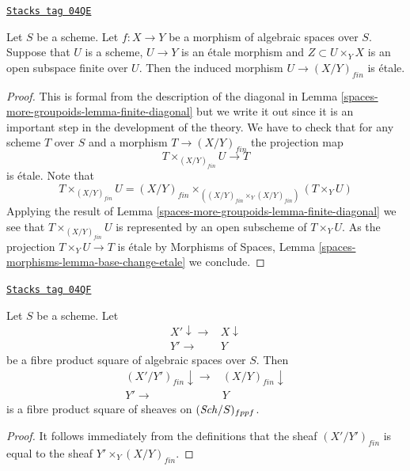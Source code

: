 \begin{lemma}
\label{spaces-more-groupoids-lemma-finite-criterion-etale}
\href{https://stacks.math.columbia.edu/tag/04QE}{\texttt{Stacks tag 04QE}}

Let $S$ be a scheme.
Let $f : X \to Y$ be a morphism of algebraic spaces over $S$.
Suppose that $U$ is a scheme, $U \to Y$ is an \'etale morphism and
$Z \subset U \times_Y X$ is an open subspace finite over $U$.
Then the induced morphism $U \to (X/Y)_{fin}$ is \'etale.
\end{lemma}

\begin{proof}
This is formal from the description of the diagonal in
Lemma \ref{spaces-more-groupoids-lemma-finite-diagonal}
but we write it out since it is an important step in the development
of the theory. We have to check that for any scheme $T$ over $S$ and a morphism
$T \to (X/Y)_{fin}$ the projection map
$$
T \times_{(X/Y)_{fin}} U \longrightarrow T
$$
is \'etale. Note that
$$
T \times_{(X/Y)_{fin}} U
=
(X/Y)_{fin} \times_{((X/Y)_{fin} \times_Y (X/Y)_{fin})} (T \times_Y U)
$$
Applying the result of
Lemma \ref{spaces-more-groupoids-lemma-finite-diagonal}
we see that $T \times_{(X/Y)_{fin}} U$ is represented by an open subscheme of
$T \times_Y U$. As the projection $T \times_Y U \to T$ is \'etale by
Morphisms of Spaces, Lemma \ref{spaces-morphisms-lemma-base-change-etale}
we conclude.
\end{proof}

\begin{lemma}
\label{spaces-more-groupoids-lemma-finite-pullback}
\href{https://stacks.math.columbia.edu/tag/04QF}{\texttt{Stacks tag 04QF}}

Let $S$ be a scheme.
Let
$$
\begin{array}{cc}X' \downarrow\longrightarrow & X \downarrow \\ Y' \longrightarrow & Y\end{array}
$$
be a fibre product square of algebraic spaces over $S$. Then
$$
\begin{array}{cc}(X'/Y')_{fin} \downarrow\longrightarrow & (X/Y)_{fin} \downarrow \\ Y' \longrightarrow & Y\end{array}
$$
is a fibre product square of sheaves on $(\mathit{Sch}/S)_{fppf}$.
\end{lemma}

\begin{proof}
It follows immediately from the definitions that
the sheaf $(X'/Y')_{fin}$ is equal to the sheaf
$Y' \times_Y (X/Y)_{fin}$.
\end{proof}


